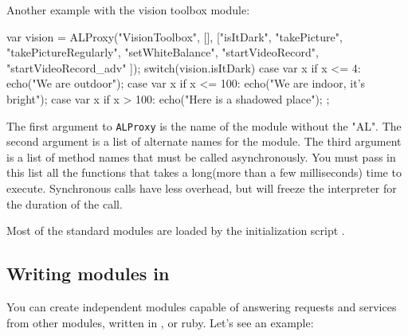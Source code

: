 Another example with the vision toolbox module:
\begin{urbiunchecked}
var vision = ALProxy("VisionToolbox", [], ["isItDark",
  "takePicture", "takePictureRegularly", "setWhiteBalance",
  "startVideoRecord", "startVideoRecord_adv" ]);
switch(vision.isItDark)
{
  case var x if x <= 4:
    echo("We are outdoor");
  case var x if x <= 100:
    echo("We are indoor, it's bright");
  case var x if x > 100:
    echo("Here is a shadowed place");
};
\end{urbiunchecked}

The first argument to \lstinline|ALProxy| is the name of the module without
the "AL". The second argument is a list of alternate names for the module.
The third argument is a list of method names that must be called asynchronously.
You must pass in this list all the functions that takes a long(more than a few
milliseconds) time to execute. Synchronous calls have less overhead, but will freeze the \us interpreter for the duration of the call.

Most of the standard modules are loaded by the initialization script
.

\subsection{Writing \naoqi modules in \urbi}

You can create independent modules capable of answering requests and
services from other \naoqi modules, written in \Cxx, \us or
ruby. Let's see an example:


